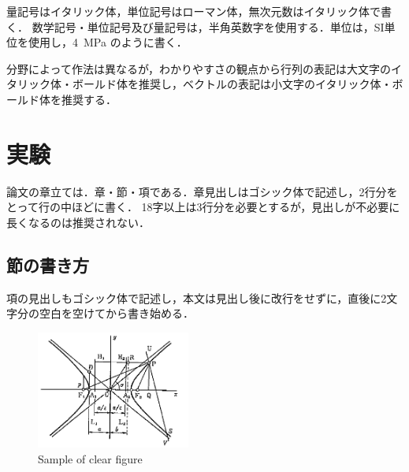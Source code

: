 \documentclass[10pt]{jarticle}
\begin{document}
    量記号はイタリック体，単位記号はローマン体，無次元数はイタリック体で書く．
    数学記号・単位記号及び量記号は，半角英数字を使用する．単位は，SI単位を使用し，4~MPa のように書く．
    
    分野によって作法は異なるが，わかりやすさの観点から行列の表記は大文字のイタリック体・ボールド体を推奨し，ベクトルの表記は小文字のイタリック体・ボールド体を推奨する．
    
    \section{実験}%
    
    論文の章立ては．章・節・項である．章見出しはゴシック体で記述し，2行分をとって行の中ほどに書く．
    18字以上は3行分を必要とするが，見出しが不必要に長くなるのは推奨されない．
    
    \subsection{節の書き方}
    
    項の見出しもゴシック体で記述し，本文は見出し後に改行をせずに，直後に2文字分の空白を空けてから書き始める．
    
    \begin{center}
        \begin{figure}[!b]
            \includegraphics[width=0.45\textwidth]{./fig/sample.png}
            \caption{Sample of clear figure}
            \label{fig:sample-fig}
        \end{figure}
    \end{center}
    
\end{document}
